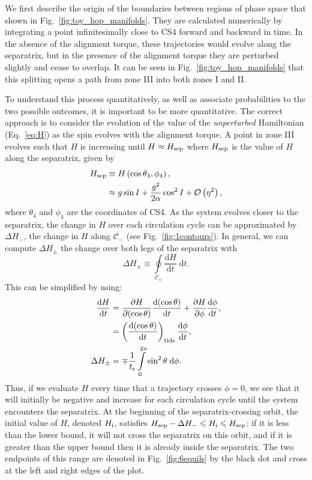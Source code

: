 \documentclass[
        fleqn,
        usenatbib,
    ]{mnras}
\newcommand*{\rd}[2]{\frac{\mathrm{d}#1}{\mathrm{d}#2}}
\newcommand*{\pd}[2]{\frac{\partial#1}{\partial#2}}
\newcommand*{\p}[1]{\left(#1\right)}
\begin{document}
We first describe the origin of the boundaries between regions of phase space
that shown in Fig.~\ref{fig:toy_hop_manifolds}. They are calculated numerically
by integrating a point infinitesimally close to CS4 forward and backward in
time. In the absence of the alignment torque, these trajectories would evolve
along the separatrix, but in the presence of the alignment torque they are
perturbed slightly and cease to overlap. It can be seen in
Fig.~\ref{fig:toy_hop_manifolds} that this splitting opens a path from zone III
into both zones I and II\@.

To understand this process quantitatively, as well as associate probabilities to
the two possible outcomes, it is important to be more quantitative. The correct
approach is to consider the evolution of the value of the \emph{unperturbed}
Hamiltonian (Eq.~\ref{eq:H}) as the spin evolves with the alignment torque. A
point in zone III evolves such that $H$ is increasing until $H \approx H_{\rm
sep}$ where $H_{\rm sep}$ is the value of $H$ along the separatrix, given by
\begin{align}
    H_{\rm sep} &\equiv H\p{\cos \theta_{\rm 4}, \phi_{\rm 4}},\nonumber\\
        &\approx g\sin I + \frac{g^2}{2\alpha}\cos^2 I +
            \mathcal{O}\p{\eta^2},\label{eq:def_Hsep}
\end{align}
where $\theta_4$ and $\phi_4$ are the coordinates of CS4. As the system evolves
closer to the separatrix, the change in $H$ over each circulation cycle can be
approximated by $\Delta H_-$, the change in $H$ along $\mathcal{C}_-$ (see
Fig.~\ref{fig:1contours}). In general, we can compute $\Delta H_{\pm}$ the
change over both legs of the separatrix with
\begin{equation}
    \Delta H_{\pm} \equiv \oint\limits_{\mathcal{C}_{\pm}}
        \rd{H}{t}\;\mathrm{d}t.\label{eq:def_dHpm}
\end{equation}
This can be simplified by using:
\begin{align}
    \rd{H}{t} &=
            \pd{H}{(\cos \theta)}\rd{(\cos \theta)}{t}
            + \pd{H}{\phi}\rd{\phi}{t},\nonumber\\
        &= \p{\rd{(\cos\theta)}{t}}_{\rm tide} \rd{\phi}{t},\\
    \Delta H_{\pm} &= \mp\frac{1}{t_{\rm s}}
        \int\limits_0^{2\pi} \sin^2\theta\;\mathrm{d}\phi.
\end{align}
Thus, if we evaluate $H$ every time that a trajectory crosses $\phi = 0$, we see
that it will initially be negative and increase for each circulation cycle until
the system encounters the separatrix. At the beginning of the
separatrix-crossing orbit, the initial value of $H$, denoted $H_{\rm i}$,
satisfies $H_{\rm sep} - \Delta H_- \leq H_{\rm i} \leq H_{\rm sep}$: if it is
less than the lower bound, it will not cross the separatrix on this orbit, and
if it is greater than the upper bound then it is already inside the separatrix.
The two endpoints of this range are denoted in Fig.~\ref{fig:6equils} by the
black dot and cross at the left and right edges of the plot.
\end{document}
